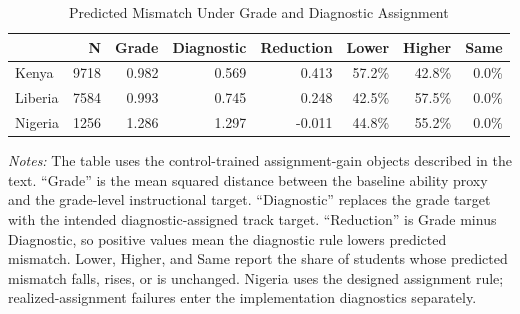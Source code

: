 \begin{table}[H]
\centering
\caption{Predicted Mismatch Under Grade and Diagnostic Assignment}
\label{tab:assignment_value_summary}
\begin{threeparttable}
\footnotesize
\begin{tabular}[t]{lrrrrrrr}
\toprule
 & N & Grade & Diagnostic & Reduction & Lower & Higher & Same \\
\midrule
Kenya & 9718 & 0.982 & 0.569 & 0.413 & 57.2\% & 42.8\% & 0.0\% \\
Liberia & 7584 & 0.993 & 0.745 & 0.248 & 42.5\% & 57.5\% & 0.0\% \\
Nigeria & 1256 & 1.286 & 1.297 & -0.011 & 44.8\% & 55.2\% & 0.0\% \\
\bottomrule
\end{tabular}
\begin{tablenotes}
\footnotesize
\item \textit{Notes:} The table uses the control-trained assignment-gain objects described in the text. ``Grade'' is the mean squared distance between the baseline ability proxy and the grade-level instructional target. ``Diagnostic'' replaces the grade target with the intended diagnostic-assigned track target. ``Reduction'' is Grade minus Diagnostic, so positive values mean the diagnostic rule lowers predicted mismatch. Lower, Higher, and Same report the share of students whose predicted mismatch falls, rises, or is unchanged. Nigeria uses the designed assignment rule; realized-assignment failures enter the implementation diagnostics separately.
\end{tablenotes}
\end{threeparttable}
\end{table}
